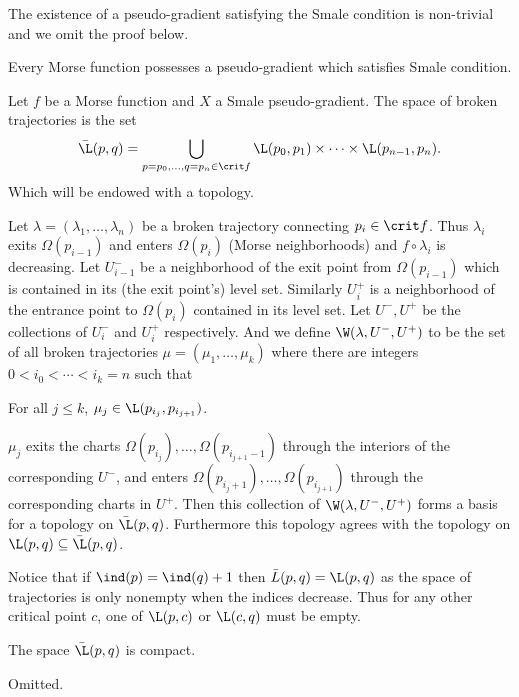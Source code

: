 The existence of a pseudo-gradient satisfying the Smale condition is non-trivial and we omit the proof below.

\bthrm

    Every Morse function possesses a pseudo-gradient which satisfies Smale condition.

\ethrm

\bdefn

    Let $f$ be a Morse function and $X$ a Smale pseudo-gradient.
    The {\emphcolor space of broken trajectories} is the set
    $$ \bar\L(p,q) = \bigcup_{p=p_0,\dots,q=p_n\in\crit f}\L(p_0,p_1)\times\cdots\times\L(p_{n-1},p_n) . $$
    Which will be endowed with a topology.

\edefn

Let $\lambda=(\lambda_1,\dots,\lambda_n)$ be a broken trajectory connecting $p_i\in\crit f$.
Thus $\lambda_i$ exits $\Omega(p_{i-1})$ and enters $\Omega(p_i)$ (Morse neighborhoods) and $f\circ\lambda_i$ is decreasing.
Let $U_{i-1}^-$ be a neighborhood of the exit point from $\Omega(p_{i-1})$ which is contained in its (the exit point's) level set.
Similarly $U_i^+$ is a neighborhood of the entrance point to $\Omega(p_i)$ contained in its level set.
Let $U^-,U^+$ be the collections of $U^-_i$ and $U^+_i$ respectively.
And we define $\W(\lambda,U^-,U^+)$ to be the set of all broken trajectories $\mu=(\mu_1,\dots,\mu_k)$ where there are integers $0<i_0<\cdots<i_k=n$ such that
\benum
    \item For all $j\leq k$, $\mu_j\in\L(p_{i_j},p_{i_{j+1}})$.
    \item $\mu_j$ exits the charts $\Omega(p_{i_j}),\dots,\Omega(p_{i_{j+1}-1})$ through the interiors of the corresponding $U^-$, and enters $\Omega(p_{i_j+1}),\dots,\Omega(p_{i_{j+1}})$
    through the corresponding charts in $U^+$.
\eenum
Then this collection of $\W(\lambda,U^-,U^+)$ forms a basis for a topology on $\bar\L(p,q)$.
Furthermore this topology agrees with the topology on $\L(p,q)\subseteq\bar\L(p,q)$.

Notice that if $\ind(p)=\ind(q)+1$ then $\bar L(p,q)=\L(p,q)$ as the space of trajectories is only nonempty when the indices decrease.
Thus for any other critical point $c$, one of $\L(p,c)$ or $\L(c,q)$ must be empty.

\bprop

    The space $\bar\L(p,q)$ is compact.

\eprop

\bproof

    Omitted.\CITE

